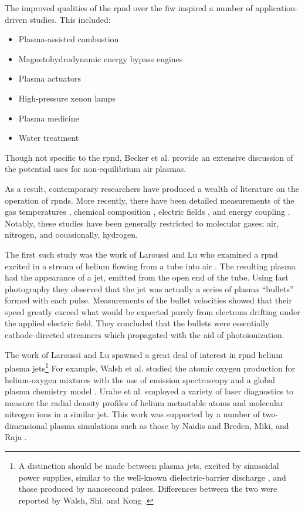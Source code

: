 The improved qualities of the \acs{rpnd} over the \acs{fiw} inspired a number of
application-driven studies. This included:
\begin{itemize}
  \item Plasma-assisted combustion \cite{Pancheshnyi2006, Starikovskaia2006, 
        Adamovich2008}
  \item Magnetohydrodynamic energy bypass engines \cite{Macheret2002,
        Adamovich2008, Schneider2009a}
  \item Plasma actuators \cite{Starikovskii2009, Adamovich2009}
  \item High-pressure xenon lamps \cite{Nikandrov2008}
  \item Plasma medicine \cite{Ayan2009, Zimmermann2012}
  \item Water treatment \cite{Foster2013}
\end{itemize}
Though not specific to the \acs{rpnd}, Becker et al. \cite{Becker2005} provide
an extensive discussion of the potential uses for non-equilibrium air plasmas.

As a result, contemporary researchers have produced a wealth of literature on
the operation of \acs{rpnd}s. More recently, there have been detailed
measurements of the gas temperatures \cite{Pilla2006, Pancheshnyi2006,
Nishihara2006, Bao2007, Lou2007, Pai2009, Zuzeek2010, Nishihara2011}, chemical
composition \cite{Bao2007, Lou2007, Pai2009}, electric fields \cite{Ito2009,
Ito2010, Muller2011a}, and energy coupling \cite{Macheret2006, Pancheshnyi2006}.
Notably, these studies have been generally restricted to molecular gases; air,
nitrogen, and occasionally, hydrogen.

The first such study was the work of Laroussi and Lu who examined a
\acs{rpnd} excited in a stream of helium flowing from a tube into air
\cite{Laroussi2005, Lu2006}. The resulting plasma had the appearance of a jet,
emitted from the open end of the tube. Using fast photography they observed that
the jet was actually a series of plasma ``bullets'' formed with each pulse.
Measurements of the bullet velocities showed that their speed greatly exceed
what would be expected purely from electrons drifting under the applied electric
field. They concluded that the bullets were essentially cathode-directed
streamers which propagated with the aid of photoionization.

The work of Laroussi and Lu spawned a great deal of interest in \acs{rpnd}
helium plasma jets\footnote{A distinction should be made between plasma jets,
excited by sinusoidal power supplies, similar to the well-known
dielectric-barrier discharge \cite{Kogelschatz2003}, and those produced by
nanosecond pulses. Differences between the two were reported by Walsh, Shi, and
Kong \cite{Walsh2006}.} For example, Walsh et al. studied the atomic oxygen
production for helium-oxygen mixtures with the use of emission spectroscopy and
a global plasma chemistry model \cite{Walsh2010}. Urabe et al. employed a
variety of laser diagnostics to measure the radial density profiles of helium
metastable atoms and molecular nitrogen ions in a similar jet. This work was
supported by a number of two-dimensional plasma simulations such as those by
Naidis \cite{Naidis2010} and Breden, Miki, and Raja \cite{Breden2011}.

